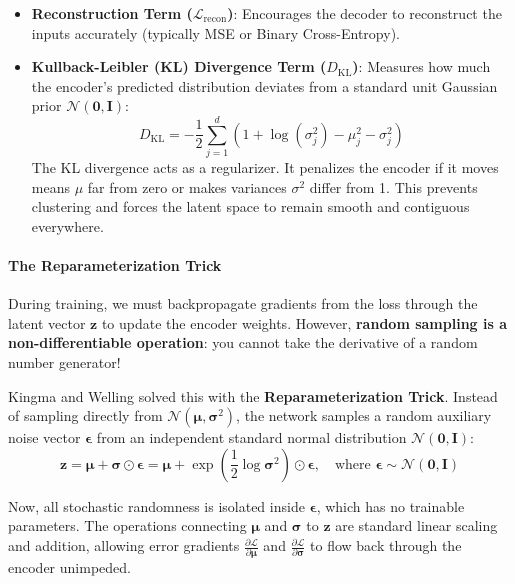 \begin{itemize}
    \item \textbf{Reconstruction Term ($\mathcal{L}_{\text{recon}}$)}: Encourages the decoder to reconstruct the inputs accurately (typically MSE or Binary Cross-Entropy).
    \item \textbf{Kullback-Leibler (KL) Divergence Term ($D_{\text{KL}}$)}: Measures how much the encoder's predicted distribution deviates from a standard unit Gaussian prior $\mathcal{N}(\mathbf{0}, \mathbf{I})$:
    \begin{equation}
    D_{\text{KL}} = -\frac{1}{2} \sum_{j=1}^d \left( 1 + \log(\sigma_j^2) - \mu_j^2 - \sigma_j^2 \right)\label{eq:kl_formula}
    \end{equation}
    The KL divergence acts as a regularizer. It penalizes the encoder if it moves means $\mu$ far from zero or makes variances $\sigma^2$ differ from 1. This prevents clustering and forces the latent space to remain smooth and contiguous everywhere.
\end{itemize}

\paragraph{The Reparameterization Trick}
During training, we must backpropagate gradients from the loss through the latent vector $\mathbf{z}$ to update the encoder weights. However, \textbf{random sampling is a non-differentiable operation}: you cannot take the derivative of a random number generator!

Kingma and Welling solved this with the \textbf{Reparameterization Trick}. Instead of sampling directly from $\mathcal{N}(\boldsymbol{\mu}, \boldsymbol{\sigma}^2)$, the network samples a random auxiliary noise vector $\boldsymbol{\epsilon}$ from an independent standard normal distribution $\mathcal{N}(\mathbf{0}, \mathbf{I})$:
\begin{equation}
\mathbf{z} = \boldsymbol{\mu} + \boldsymbol{\sigma} \odot \boldsymbol{\epsilon} = \boldsymbol{\mu} + \exp\left(\frac{1}{2}\log\boldsymbol{\sigma}^2\right) \odot \boldsymbol{\epsilon}, \quad \text{where } \boldsymbol{\epsilon} \sim \mathcal{N}(\mathbf{0}, \mathbf{I})\label{eq:reparam_trick}
\end{equation}

Now, all stochastic randomness is isolated inside $\boldsymbol{\epsilon}$, which has no trainable parameters. The operations connecting $\boldsymbol{\mu}$ and $\boldsymbol{\sigma}$ to $\mathbf{z}$ are standard linear scaling and addition, allowing error gradients $\frac{\partial \mathcal{L}}{\partial \boldsymbol{\mu}}$ and $\frac{\partial \mathcal{L}}{\partial \boldsymbol{\sigma}}$ to flow back through the encoder unimpeded.

